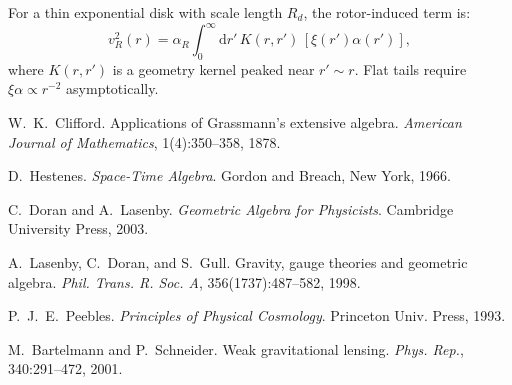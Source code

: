 \documentclass[11pt,a4paper]{article}
\numberwithin{equation}{section}
\theoremstyle{plain}
\theoremstyle{definition}
\theoremstyle{remark}
\newcommand{\dd}{\mathrm{d}}
\begin{document}
For a thin exponential disk with scale length $R_d$, the rotor-induced term is:
\begin{equation}
v_R^2(r)=\alpha_R \int_0^\infty \dd r'\,K(r,r')\,[\xi(r')\alpha(r')],
\end{equation}
where $K(r,r')$ is a geometry kernel peaked near $r'\!\sim\!r$. Flat tails require $\xi\alpha \propto r^{-2}$ asymptotically.

\begin{thebibliography}{9}

W.~K.~Clifford.
\newblock Applications of Grassmann's extensive algebra.
\newblock \emph{American Journal of Mathematics}, 1(4):350--358, 1878.

D.~Hestenes.
\newblock \emph{Space-Time Algebra}.
\newblock Gordon and Breach, New York, 1966.

C.~Doran and A.~Lasenby.
\newblock \emph{Geometric Algebra for Physicists}.
\newblock Cambridge University Press, 2003.

A.~Lasenby, C.~Doran, and S.~Gull.
\newblock Gravity, gauge theories and geometric algebra.
\newblock \emph{Phil. Trans. R. Soc. A}, 356(1737):487--582, 1998.

P.~J.~E.~Peebles.
\newblock \emph{Principles of Physical Cosmology}.
\newblock Princeton Univ. Press, 1993.

M.~Bartelmann and P.~Schneider.
\newblock Weak gravitational lensing.
\newblock \emph{Phys. Rep.}, 340:291--472, 2001.

\end{thebibliography}
\end{document}
